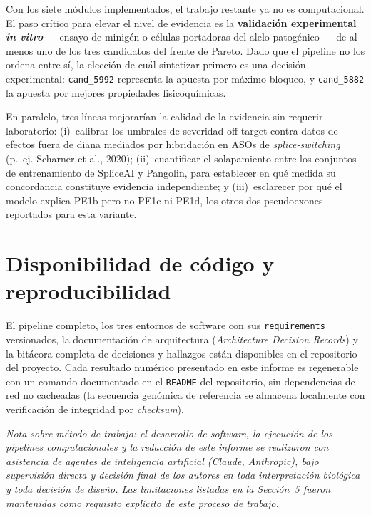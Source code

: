 \documentclass[11pt,a4paper]{article}
\begin{document}
Con los siete módulos implementados, el trabajo restante ya no es computacional. El paso crítico para elevar el nivel de evidencia es la \textbf{validación experimental \emph{in vitro}} --- ensayo de minigén o células portadoras del alelo patogénico --- de al menos uno de los tres candidatos del frente de Pareto. Dado que el pipeline no los ordena entre sí, la elección de cuál sintetizar primero es una decisión experimental: \texttt{cand\_5992} representa la apuesta por máximo bloqueo, y \texttt{cand\_5882} la apuesta por mejores propiedades fisicoquímicas.

En paralelo, tres líneas mejorarían la calidad de la evidencia sin requerir laboratorio: (i)~calibrar los umbrales de severidad off-target contra datos de efectos fuera de diana mediados por hibridación en ASOs de \emph{splice-switching} (p.~ej. Scharner et al., 2020); (ii)~cuantificar el solapamiento entre los conjuntos de entrenamiento de SpliceAI y Pangolin, para establecer en qué medida su concordancia constituye evidencia independiente; y (iii)~esclarecer por qué el modelo explica PE1b pero no PE1c ni PE1d, los otros dos pseudoexones reportados para esta variante.

\section{Disponibilidad de código y reproducibilidad}

El pipeline completo, los tres entornos de software con sus \texttt{requirements} versionados, la documentación de arquitectura (\emph{Architecture Decision Records}) y la bitácora completa de decisiones y hallazgos están disponibles en el repositorio del proyecto. Cada resultado numérico presentado en este informe es regenerable con un comando documentado en el \texttt{README} del repositorio, sin dependencias de red no cacheadas (la secuencia genómica de referencia se almacena localmente con verificación de integridad por \emph{checksum}).

\vspace{1em}
\noindent\textit{Nota sobre método de trabajo: el desarrollo de software, la ejecución de los pipelines computacionales y la redacción de este informe se realizaron con asistencia de agentes de inteligencia artificial (Claude, Anthropic), bajo supervisión directa y decisión final de los autores en toda interpretación biológica y toda decisión de diseño. Las limitaciones listadas en la Sección~5 fueron mantenidas como requisito explícito de este proceso de trabajo.}
\end{document}
